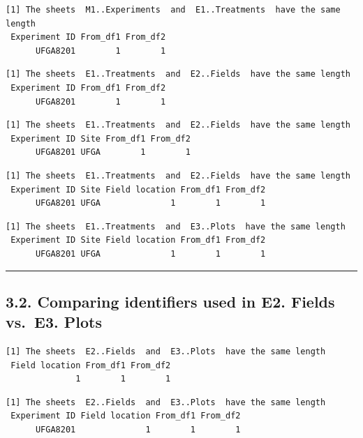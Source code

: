 \documentclass[
]{article}
\begin{document}
\begin{verbatim}
[1] The sheets  M1..Experiments  and  E1..Treatments  have the same length
 Experiment ID From_df1 From_df2
      UFGA8201        1        1
\end{verbatim}

\begin{verbatim}
[1] The sheets  E1..Treatments  and  E2..Fields  have the same length
 Experiment ID From_df1 From_df2
      UFGA8201        1        1
\end{verbatim}

\begin{verbatim}
[1] The sheets  E1..Treatments  and  E2..Fields  have the same length
 Experiment ID Site From_df1 From_df2
      UFGA8201 UFGA        1        1
\end{verbatim}

\begin{verbatim}
[1] The sheets  E1..Treatments  and  E2..Fields  have the same length
 Experiment ID Site Field location From_df1 From_df2
      UFGA8201 UFGA              1        1        1
\end{verbatim}

\begin{verbatim}
[1] The sheets  E1..Treatments  and  E3..Plots  have the same length
 Experiment ID Site Field location From_df1 From_df2
      UFGA8201 UFGA              1        1        1
\end{verbatim}

\begin{center}\rule{0.5\linewidth}{0.5pt}\end{center}

\subsection{3.2. Comparing identifiers used in E2. Fields vs.~E3.
Plots}\label{comparing-identifiers-used-in-e2.-fields-vs.-e3.-plots}

\begin{verbatim}
[1] The sheets  E2..Fields  and  E3..Plots  have the same length
 Field location From_df1 From_df2
              1        1        1
\end{verbatim}

\begin{verbatim}
[1] The sheets  E2..Fields  and  E3..Plots  have the same length
 Experiment ID Field location From_df1 From_df2
      UFGA8201              1        1        1
\end{verbatim}
\end{document}
